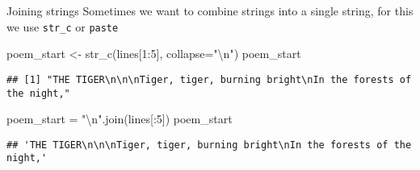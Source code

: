 \documentclass[
  10pt,
  ignorenonframetext,
  aspectratio=169]{beamer}
\newenvironment{Shaded}{\begin{snugshade}}{\end{snugshade}}
\newcommand{\AttributeTok}[1]{\textcolor[rgb]{0.80,0.80,0.80}{#1}}
\newcommand{\CharTok}[1]{\textcolor[rgb]{0.86,0.64,0.64}{#1}}
\newcommand{\DecValTok}[1]{\textcolor[rgb]{0.86,0.86,0.80}{#1}}
\newcommand{\FunctionTok}[1]{\textcolor[rgb]{0.94,0.94,0.56}{#1}}
\newcommand{\NormalTok}[1]{\textcolor[rgb]{0.80,0.80,0.80}{#1}}
\newcommand{\OperatorTok}[1]{\textcolor[rgb]{0.94,0.94,0.82}{#1}}
\newcommand{\OtherTok}[1]{\textcolor[rgb]{0.94,0.94,0.56}{#1}}
\newcommand{\SpecialCharTok}[1]{\textcolor[rgb]{0.86,0.64,0.64}{#1}}
\newcommand{\StringTok}[1]{\textcolor[rgb]{0.80,0.58,0.58}{#1}}
\begin{document}
\begin{frame}[fragile]{Joining strings}
\protect\hypertarget{joining-strings}{}
Sometimes we want to combine strings into a single string, for this we
use \texttt{str\_c} or \texttt{paste}

\scriptsize

\begin{Shaded}
\begin{Highlighting}[]
\NormalTok{poem\_start }\OtherTok{\textless{}{-}} \FunctionTok{str\_c}\NormalTok{(lines[}\DecValTok{1}\SpecialCharTok{:}\DecValTok{5}\NormalTok{], }\AttributeTok{collapse=}\StringTok{"}\SpecialCharTok{\textbackslash{}n}\StringTok{"}\NormalTok{)}
\NormalTok{poem\_start}
\end{Highlighting}
\end{Shaded}

\begin{verbatim}
## [1] "THE TIGER\n\n\nTiger, tiger, burning bright\nIn the forests of the night,"
\end{verbatim}

\begin{Shaded}
\begin{Highlighting}[]
\NormalTok{poem\_start }\OperatorTok{=} \StringTok{"}\CharTok{\textbackslash{}n}\StringTok{"}\NormalTok{.join(lines[:}\DecValTok{5}\NormalTok{])}
\NormalTok{poem\_start}
\end{Highlighting}
\end{Shaded}

\begin{verbatim}
## 'THE TIGER\n\n\nTiger, tiger, burning bright\nIn the forests of the night,'
\end{verbatim}
\end{frame}
\end{document}
